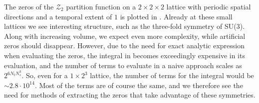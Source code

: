 The zeros of the $\mathcal{Z}_2$ partition function on a $2\times{}2\times{}2$
lattice with periodic spatial directions and a temporal extent of $1$ is plotted
in . Already at these small lattices we see
interesting structure, such as the three-fold symmetry of SU($3$).  Along with
increasing volume, we expect even more complexity, while artificial zeros should
disappear. However, due to the need for exact analytic expression when
evaluating the zeros, the integral in 
becomes exceedingly expensive in its evaluation, and the number of terms to
evaluate in a naive approach scales as $2^{6 N_t N_s^3}$. So, even for a
$1\times{}2^3$ lattice, the number of terms for the integral would be $\sim 2.8
\cdot 10^{14}$. Most of the terms are of course the same, and we therefore see
the need for methods of extracting the zeros that take advantage of these
symmetries.
